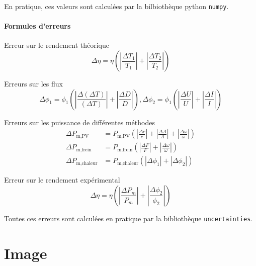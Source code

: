En pratique, ces valeurs sont calculées par la bilbiothèque python \texttt{numpy}.

\paragraph*{Formules d'erreurs}

Erreur sur le rendement théorique
\begin{equation}
    \Delta \eta = \eta \left( \left|\frac{\Delta T_1}{T_1}\right| + \left|\frac{\Delta T_2}{T_2}\right| \right)
\end{equation}

Erreurs sur les flux
\begin{equation}
    \Delta \phi_1 = \phi_1 \left( \left|\frac{\Delta (\Delta T)}{(\Delta T)}\right| + \left|\frac{\Delta D}{D}\right| \right), 
    \Delta \phi_2 = \phi_1 \left( \left|\frac{\Delta U}{U}\right| + \left|\frac{\Delta I}{I}\right| \right)
\end{equation}

Erreurs sur les puissance de différentes méthodes
\begin{align}
    \Delta P_\textrm{m,PV} &= P_\textrm{m,PV} \left( \left|\frac{\Delta c}{c}\right| + \left|\frac{\Delta A}{A}\right| + \left|\frac{\Delta \omega}{\omega}\right| \right)\\
    \Delta P_\textrm{m,frein} &= P_\textrm{m,frein} \left( \left|\frac{\Delta F}{F}\right| + \left|\frac{\Delta \omega}{\omega}\right| \right)\\
    \Delta P_\textrm{m,chaleur} &= P_\textrm{m,chaleur} (|\Delta \phi_1| + |\Delta \phi_2|)
\end{align}

Erreur sur le rendement expérimental 
\begin{equation}
    \Delta \eta = \eta \left( \left|\frac{\Delta P_m}{P_m}\right| + \left|\frac{\Delta \phi_2}{\phi_2}\right| \right)
\end{equation}

Toutes ces erreurs sont calculées en pratique par la bibliothèque \texttt{uncertainties}.

\section{Image}
\label{sec:image}


